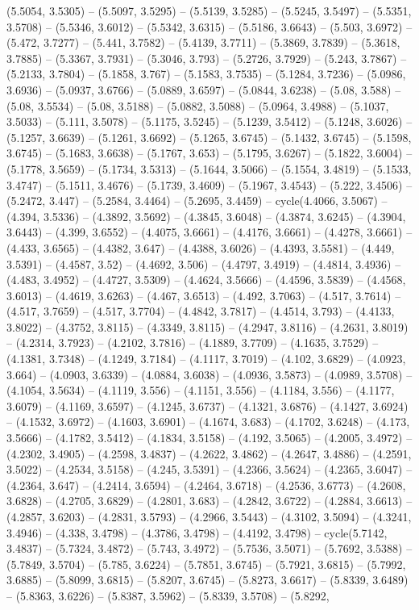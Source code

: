 (5.5054, 3.5305) -- (5.5097, 3.5295) -- (5.5139, 3.5285) -- (5.5245, 3.5497) -- (5.5351, 3.5708) -- (5.5346, 3.6012) -- (5.5342, 3.6315) -- (5.5186, 3.6643) -- (5.503, 3.6972) -- (5.472, 3.7277) -- (5.441, 3.7582) -- (5.4139, 3.7711) -- (5.3869, 3.7839) -- (5.3618, 3.7885) -- (5.3367, 3.7931) -- (5.3046, 3.793) -- (5.2726, 3.7929) -- (5.243, 3.7867) -- (5.2133, 3.7804) -- (5.1858, 3.767) -- (5.1583, 3.7535) -- (5.1284, 3.7236) -- (5.0986, 3.6936) -- (5.0937, 3.6766) -- (5.0889, 3.6597) -- (5.0844, 3.6238) -- (5.08, 3.588) -- (5.08, 3.5534) -- (5.08, 3.5188) -- (5.0882, 3.5088) -- (5.0964, 3.4988) -- (5.1037, 3.5033) -- (5.111, 3.5078) -- (5.1175, 3.5245) -- (5.1239, 3.5412) -- (5.1248, 3.6026) -- (5.1257, 3.6639) -- (5.1261, 3.6692) -- (5.1265, 3.6745) -- (5.1432, 3.6745) -- (5.1598, 3.6745) -- (5.1683, 3.6638) -- (5.1767, 3.653) -- (5.1795, 3.6267) -- (5.1822, 3.6004) -- (5.1778, 3.5659) -- (5.1734, 3.5313) -- (5.1644, 3.5066) -- (5.1554, 3.4819) -- (5.1533, 3.4747) -- (5.1511, 3.4676) -- (5.1739, 3.4609) -- (5.1967, 3.4543) -- (5.222, 3.4506) -- (5.2472, 3.447) -- (5.2584, 3.4464) -- (5.2695, 3.4459) -- cycle(4.4066, 3.5067) -- (4.394, 3.5336) -- (4.3892, 3.5692) -- (4.3845, 3.6048) -- (4.3874, 3.6245) -- (4.3904, 3.6443) -- (4.399, 3.6552) -- (4.4075, 3.6661) -- (4.4176, 3.6661) -- (4.4278, 3.6661) -- (4.433, 3.6565) -- (4.4382, 3.647) -- (4.4388, 3.6026) -- (4.4393, 3.5581) -- (4.449, 3.5391) -- (4.4587, 3.52) -- (4.4692, 3.506) -- (4.4797, 3.4919) -- (4.4814, 3.4936) -- (4.483, 3.4952) -- (4.4727, 3.5309) -- (4.4624, 3.5666) -- (4.4596, 3.5839) -- (4.4568, 3.6013) -- (4.4619, 3.6263) -- (4.467, 3.6513) -- (4.492, 3.7063) -- (4.517, 3.7614) -- (4.517, 3.7659) -- (4.517, 3.7704) -- (4.4842, 3.7817) -- (4.4514, 3.793) -- (4.4133, 3.8022) -- (4.3752, 3.8115) -- (4.3349, 3.8115) -- (4.2947, 3.8116) -- (4.2631, 3.8019) -- (4.2314, 3.7923) -- (4.2102, 3.7816) -- (4.1889, 3.7709) -- (4.1635, 3.7529) -- (4.1381, 3.7348) -- (4.1249, 3.7184) -- (4.1117, 3.7019) -- (4.102, 3.6829) -- (4.0923, 3.664) -- (4.0903, 3.6339) -- (4.0884, 3.6038) -- (4.0936, 3.5873) -- (4.0989, 3.5708) -- (4.1054, 3.5634) -- (4.1119, 3.556) -- (4.1151, 3.556) -- (4.1184, 3.556) -- (4.1177, 3.6079) -- (4.1169, 3.6597) -- (4.1245, 3.6737) -- (4.1321, 3.6876) -- (4.1427, 3.6924) -- (4.1532, 3.6972) -- (4.1603, 3.6901) -- (4.1674, 3.683) -- (4.1702, 3.6248) -- (4.173, 3.5666) -- (4.1782, 3.5412) -- (4.1834, 3.5158) -- (4.192, 3.5065) -- (4.2005, 3.4972) -- (4.2302, 3.4905) -- (4.2598, 3.4837) -- (4.2622, 3.4862) -- (4.2647, 3.4886) -- (4.2591, 3.5022) -- (4.2534, 3.5158) -- (4.245, 3.5391) -- (4.2366, 3.5624) -- (4.2365, 3.6047) -- (4.2364, 3.647) -- (4.2414, 3.6594) -- (4.2464, 3.6718) -- (4.2536, 3.6773) -- (4.2608, 3.6828) -- (4.2705, 3.6829) -- (4.2801, 3.683) -- (4.2842, 3.6722) -- (4.2884, 3.6613) -- (4.2857, 3.6203) -- (4.2831, 3.5793) -- (4.2966, 3.5443) -- (4.3102, 3.5094) -- (4.3241, 3.4946) -- (4.338, 3.4798) -- (4.3786, 3.4798) -- (4.4192, 3.4798) -- cycle(5.7142, 3.4837) -- (5.7324, 3.4872) -- (5.743, 3.4972) -- (5.7536, 3.5071) -- (5.7692, 3.5388) -- (5.7849, 3.5704) -- (5.785, 3.6224) -- (5.7851, 3.6745) -- (5.7921, 3.6815) -- (5.7992, 3.6885) -- (5.8099, 3.6815) -- (5.8207, 3.6745) -- (5.8273, 3.6617) -- (5.8339, 3.6489) -- (5.8363, 3.6226) -- (5.8387, 3.5962) -- (5.8339, 3.5708) -- (5.8292, 